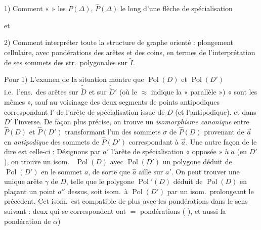 \documentclass[11pt,a4paper]{article}
\begin{document}
1) Comment «  » les $P(\Delta)$, $\widehat{P}(\Delta)$ le long d'une flèche de spécialisation

et

2) Comment interpréter toute la structure de graphe orienté : plongement cellulaire, avec pondérations des arêtes et des coins, en termes de l'interprétation de ses sommets \struck{\ill{}}  des str.\ polygonales sur $\widetilde{I}$.

Pour 1) L'examen  de la situation montre que $\operatorname{Pol}(D)$ et $\operatorname{Pol}(D')$ i.e.\ l'ens.\ des arêtes sur $\widetilde{\widetilde{D}}$ et sur $\widetilde{\widetilde{D}}'$ (où le $\approx$ indique la « parallèle »)  \struck{\ill{}} « sont les mêmes », \struck{\ill{}} sauf \struck{\ill{}} au voisinage des deux segments de points antipodiques correspondant \struck{\ill{}}  l' de l'arête de spécialisation issue de $D$ (et  l'antipodique), et dans $D'$ l'inverse. De façon plus précise,
on trouve un \emph{isomorphisme canonique} entre $\widehat{P}(D)$ et $\widehat{P}(D')$
transformant l'un des sommets $\sigma$ de $\widehat{P}(D)$ provenant de $\vec{a}$ en \struck{\ill{}}  \emph{antipodique}  des sommets de $\widehat{P}(D')$ \struck{\ill{}} correspondant à $\vec{a}$. Une autre façon de le dire est celle-ci : Désignons par $a'$ l'arête de spécialisation « opposée » à $a$ (en $D'$), on trouve un isom.\  $\operatorname{Pol}(D)$ avec  $\operatorname{Pol}(D')$ un  polygone déduit de $\operatorname{Pol}(D')$ en  le sommet $a$, de sorte que $\hat{a}$ \struck{\ill{}}  aille sur $a'$. \struck{\ill{}} On peut  trouver une unique arête $\gamma$ de $D$, telle que le polygone \struck{\ill{}} $\operatorname{Pol}'(D)$ déduit de $\operatorname{Pol}(D)$ en plaçant un point $a''$ dessus, soit isom.\ à $\operatorname{Pol}(D')$ par un isom.\ prolongeant le précédent. Cet isom.\ est compatible de plus avec les pondérations dans le sens suivant : deux   qui se correspondent ont $=$ pondérations (\ill{} \ill{} \ill{}), et aussi la pondération de $\alpha$)
\end{document}
